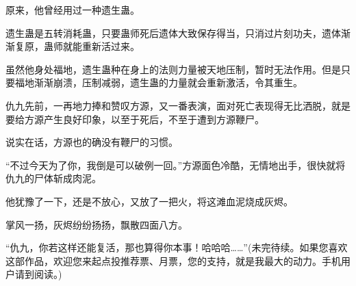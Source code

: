 \begin{this_body}
原来，他曾经用过一种遗生蛊。

遗生蛊是五转消耗蛊，只要蛊师死后遗体大致保存得当，只消过片刻功夫，遗体渐渐复原，蛊师就能重新活过来。

虽然他身处福地，遗生蛊种在身上的法则力量被天地压制，暂时无法作用。但是只要福地渐渐崩溃，压制减弱，遗生蛊的力量就会重新激活，令其重生。

仇九先前，一再地力捧和赞叹方源，又一番表演，面对死亡表现得无比洒脱，就是要给方源产生良好印象，以至于死后，不至于遭到方源鞭尸。

说实在话，方源也的确没有鞭尸的习惯。

“不过今天为了你，我倒是可以破例一回。”方源面色冷酷，无情地出手，很快就将仇九的尸体斩成肉泥。

他犹豫了一下，还是不放心，又放了一把火，将这滩血泥烧成灰烬。

掌风一扬，灰烬纷纷扬扬，飘散四面八方。

“仇九，你若这样还能复活，那也算得你本事！哈哈哈……”(未完待续。如果您喜欢这部作品，欢迎您来起点投推荐票、月票，您的支持，就是我最大的动力。手机用户请到阅读。)

\end{this_body}

